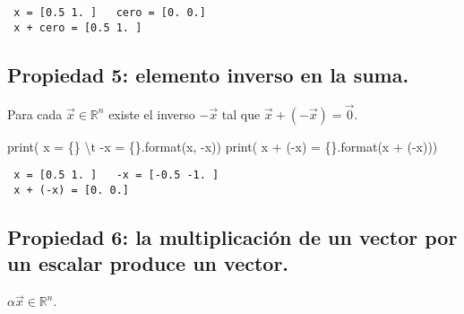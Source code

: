 \documentclass[
  letterpaper,
  DIV=11,
  numbers=noendperiod]{scrreprt}
\newenvironment{Shaded}{\begin{snugshade}}{\end{snugshade}}
\newcommand{\BuiltInTok}[1]{\textcolor[rgb]{0.00,0.23,0.31}{#1}}
\newcommand{\CharTok}[1]{\textcolor[rgb]{0.13,0.47,0.30}{#1}}
\newcommand{\NormalTok}[1]{\textcolor[rgb]{0.00,0.23,0.31}{#1}}
\newcommand{\OperatorTok}[1]{\textcolor[rgb]{0.37,0.37,0.37}{#1}}
\newcommand{\SpecialCharTok}[1]{\textcolor[rgb]{0.37,0.37,0.37}{#1}}
\newcommand{\StringTok}[1]{\textcolor[rgb]{0.13,0.47,0.30}{#1}}
\begin{document}
\begin{verbatim}
 x = [0.5 1. ]   cero = [0. 0.]
 x + cero = [0.5 1. ]
\end{verbatim}

\subsection{Propiedad 5: elemento inverso en la
suma.}\label{propiedad-5-elemento-inverso-en-la-suma.}

Para cada \(\vec{x}\in \mathbb{R}^n\) existe el inverso \(-\vec{x}\) tal
que \(\vec{x} + (-\vec{x}) = \vec{0}\).

\begin{Shaded}
\begin{Highlighting}[]
\BuiltInTok{print}\NormalTok{(}\StringTok{\textquotesingle{} x = }\SpecialCharTok{\{\}}\StringTok{ }\CharTok{\textbackslash{}t}\StringTok{ {-}x = }\SpecialCharTok{\{\}}\StringTok{\textquotesingle{}}\NormalTok{.}\BuiltInTok{format}\NormalTok{(x, }\OperatorTok{{-}}\NormalTok{x))}
\BuiltInTok{print}\NormalTok{(}\StringTok{\textquotesingle{} x + ({-}x) = }\SpecialCharTok{\{\}}\StringTok{\textquotesingle{}}\NormalTok{.}\BuiltInTok{format}\NormalTok{(x }\OperatorTok{+}\NormalTok{ (}\OperatorTok{{-}}\NormalTok{x)))}
\end{Highlighting}
\end{Shaded}

\begin{verbatim}
 x = [0.5 1. ]   -x = [-0.5 -1. ]
 x + (-x) = [0. 0.]
\end{verbatim}

\subsection{Propiedad 6: la multiplicación de un vector por un escalar
produce un
vector.}\label{propiedad-6-la-multiplicaciuxf3n-de-un-vector-por-un-escalar-produce-un-vector.}

\(\alpha \vec{x} \in \mathbb{R}^n\).
\end{document}
